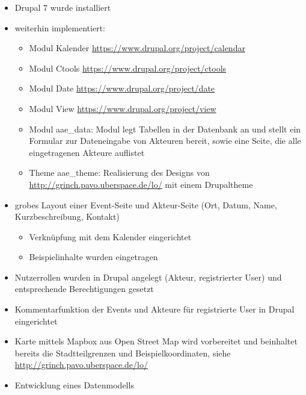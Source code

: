 \documentclass{swp}
\begin{document}
\\\\\\\\\\

\begin{itemize} 
\item Drupal 7 wurde installiert
\item weiterhin implementiert:
\begin{itemize} 
\item Modul \glqq Kalender\grqq{} \url{https://www.drupal.org/project/calendar}
\item Modul \glqq Ctools\grqq{} \url{https://www.drupal.org/project/ctools}
\item Modul \glqq Date\grqq{} \url{https://www.drupal.org/project/date}
\item Modul \glqq View\grqq{} \url{https://www.drupal.org/project/view}
\item Modul \glqq aae\_{}data\grqq{}: Modul legt Tabellen in der Datenbank an und stellt ein Formular zur Dateneingabe von Akteuren bereit, sowie eine Seite, die alle eingetragenen Akteure auflistet
\item Theme \glqq aae\_{}theme\grqq{}: Realisierung des Designs von \url{http://grinch.pavo.uberspace.de/lo/} mit einem Drupaltheme
\end{itemize}
\item grobes Layout einer Event-Seite und Akteur-Seite (Ort, Datum, Name, Kurzbeschreibung, Kontakt)
\begin{itemize}
\item Verkn\"upfung mit dem Kalender eingerichtet
\item Beispielinhalte wurden eingetragen 
\end{itemize}
\item Nutzerrollen wurden in Drupal angelegt (Akteur, registrierter User) und entsprechende Berechtigungen gesetzt
\item Kommentarfunktion der Events und Akteure f\"ur registrierte User in Drupal eingerichtet
\item Karte mittels Mapbox aus Open Street Map wird vorbereitet und beinhaltet bereits die Stadtteilgrenzen und Beispielkoordinaten, siehe \url{http://grinch.pavo.uberspace.de/lo/}
\item Entwicklung eines Datenmodells\\\\
\end{itemize}
\end{document}
